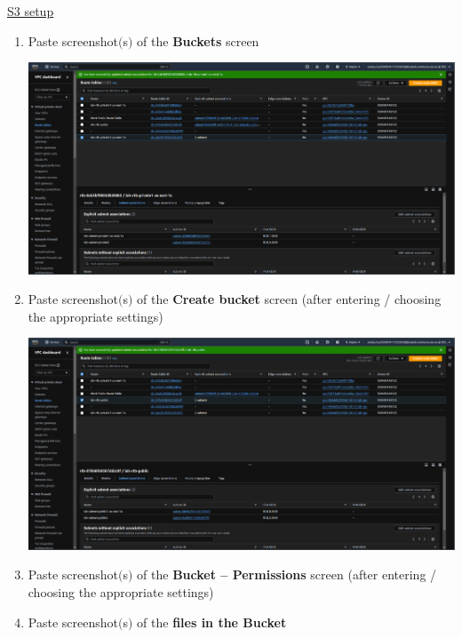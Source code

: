 \documentclass[11pt]{article}
\begin{document}
\newpage
\noindent\underline{S3 setup}    
\begin{enumerate}[resume]    
    \item Paste screenshot$($s$)$  of the \textbf{Buckets} screen  \\
    \vspace{5mm}

    {\centering
    \includegraphics[width=5.8in]{pics/9.png}
    }

    
    \item Paste screenshot$($s$)$ of the \textbf{Create bucket} screen (after entering / choosing the appropriate settings)\\
    \vspace{5mm}

    {\centering
    \includegraphics[width=5.8in]{pics/10.png}
    }


    \item Paste screenshot$($s$)$ of the \textbf{Bucket – Permissions} screen (after entering / choosing the appropriate settings)\\

    \item Paste screenshot$($s$)$ of the \textbf{files in the Bucket} \\
\end{enumerate}
\end{document}
